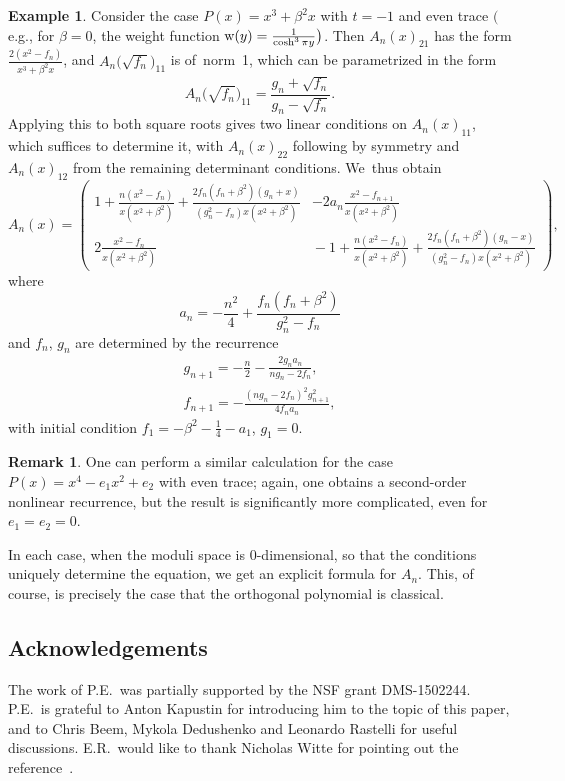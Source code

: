 \documentclass[pdftex]{sigma}
\theoremstyle{definition}
\newtheorem{Example}[Theorem]{Example}
\newtheorem{Remark}[Theorem]{Remark}
\numberwithin{equation}{section}
\begin{document}
\begin{Example}
 Consider the case $P(x)=x^3+\beta^2x$ with $t=-1$ and even trace $\big($e.g., for
 $\beta=0$, the weight function ${\rm w}(y)=\frac{1}{\cosh^3 \pi y}\big)$. Then $A_n(x)_{21}$
 has the form $\frac{2(x^2-f_n)}{x^3+\beta^2x}$, and $A_n\big(\sqrt{f_n}\big)_{11}$ is of~norm~1, which can be parametrized in the form
 \[
 A_n\big(\sqrt{f_n}\big)_{11} = \frac{g_n+\sqrt{f_n}}{g_n-\sqrt{f_n}}.
 \]
 Applying this to both square roots gives two linear conditions on
 $A_n(x)_{11}$, which suffices to determine it, with $A_n(x)_{22}$
 following by symmetry and $A_n(x)_{12}$ from the remaining determinant
 conditions. We~thus obtain
 \[
 A_n(x)
 =
 \begin{pmatrix}
 \displaystyle 1 \!+\! \frac{n(x^2\!-\!f_n)}{x(x^2\!+\!\beta^2)}
 \!+\! \frac{2f_n(f_n\!+\!\beta^2)(g_n\!+\!x)}{(g_n^2\!-\!f_n)x(x^2\!+\!\beta^2)}
 &\displaystyle
 -2 a_n \frac{x^2-f_{n+1}}{x(x^2+\beta^2)}
 \\[2ex]
 \displaystyle 2 \frac{x^2-f_n}{x(x^2+\beta^2)}
 &\displaystyle
 \!-\!1 \!+\! \frac{n(x^2\!-\!f_n)}{x(x^2\!+\!\beta^2)} \!+\! \frac{2f_n(f_n\!+\!\beta^2)(g_n\!-\!x)}{(g_n^2\!-\!f_n)x(x^2\!+\!\beta^2)}
 \end{pmatrix} ,
 \]
 where
 \[
 a_n = -\frac{n^2}{4}+\frac{f_n(f_n+\beta^2)}{g_n^2-f_n}
 \]
 and $f_n$, $g_n$ are determined by the recurrence
 \begin{gather*}
 g_{n+1} = -\frac{n}{2} - \frac{2g_na_n}{ng_n-2f_n},
 \\
 f_{n+1} = -\frac{(ng_n-2f_n)^2 g_{n+1}^2}{4f_na_n},
 \end{gather*}
 with initial condition
 $f_1 = -\beta^2-\frac{1}{4}-a_1$, $g_1 = 0$.
\end{Example}

\begin{Remark}
 One can perform a similar calculation for the case $P(x)=x^4-e_1x^2+e_2$
 with even trace; again, one obtains a second-order nonlinear recurrence,
 but the result is significantly more complicated, even for $e_1=e_2=0$.
\end{Remark}

In each case, when the moduli space is $0$-dimensional, so that the
conditions uniquely determine the equation, we get an explicit formula for
$A_n$. This, of course, is precisely the case that the orthogonal
polynomial is classical.

\subsection*{Acknowledgements} The work of P.E.\ was partially supported by the NSF grant DMS-1502244. P.E.\ is grateful to Anton Kapustin for introducing him to the topic of this paper, and to Chris Beem, Mykola Dedushenko and Leonardo Rastelli for useful discussions. E.R.\ would like to thank Nicholas Witte for pointing out the reference~\cite{Magnus}.
\end{document}
